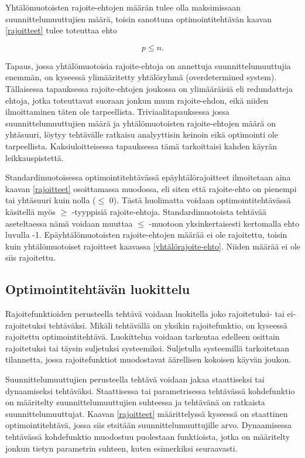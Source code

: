 \documentclass[12pt]{article}
\newenvironment{content}{\pagenumbering{arabic}}{}
\begin{document}
\begin{content}
Yhtälömuotoisten rajoite-ehtojen määrän tulee olla maksimissaan suunnittelumuuttujien määrä, toisin sanottuna optimointitehtävän kaavan \eqref{rajoitteet} tulee toteuttaa ehto

\begin{equation}
\label{yhtälörajoite-ehto}
p \leq n.
\end{equation}

Tapaus, jossa yhtälömuotoisia rajoite-ehtoja on annettuja suunnittelumuuttujia enemmän, on kyseessä ylimääritetty yhtälöryhmä (overdetermined system). Tällaisessa tapauksessa rajoite-ehtojen joukossa on ylimääräisiä eli redundatteja ehtoja, jotka toteuttavat suoraan jonkun muun rajoite-ehdon, eikä niiden ilmoittaminen täten ole tarpeellista. Triviaalitapauksessa jossa suunnittelumuuttujien määrä ja yhtälömuotoisten rajoite-ehtojen määrä on yhtäsuuri, löytyy tehtävälle ratkaisu analyyttisin keinoin eikä optimointi ole tarpeellista. Kaksiuloitteisessa tapauksessa tämä tarkoittaisi kahden käyrän leikkauspistettä. 

Standardimuotoisessa optimointitehtävässä epäyhtälörajoitteet ilmoitetaan aina kaavan \eqref{rajoitteet} osoittamassa muodossa, eli siten että rajoite-ehto on pienempi tai yhtäsuuri kuin nolla ($\leq$ 0). Tästä huolimatta voidaan optimointitehtävässä käsitellä myös $\geq$ -tyyppisiä rajoite-ehtoja. Standardimuotoista tehtävää aseteltaessa nämä voidaan muuttaa $\leq$ -muotoon yksinkertaisesti kertomalla ehto luvulla -1. Epäyhtälömuotoisten rajoite-ehtojen määrää ei ole rajoitettu, toisin kuin yhtälömuotoiset rajoitteet kaavassa \eqref{yhtälörajoite-ehto}. Niiden määrää ei ole siis rajoitettu.   \parencite[43]{intro}

\subsection{Optimointitehtävän luokittelu}


Rajoitefunktioiden perusteella tehtävä voidaan luokitella joko rajoitetuksi- tai ei-rajoitetuksi tehtäväksi. Mikäli tehtävällä on yksikin rajoitefunktio, on kyseessä rajoitettu optimointitehtävä. Luokittelua voidaan tarkentaa edelleen osittain rajoitetuksi tai täysin suljetuksi systeemiksi. Suljetulla systeemillä tarkoitetaan tilannetta, jossa rajoitefunktiot muodostavat äärellisen kokoisen käyvän joukon. 

Suunnittelumuuttujien perusteella tehtävä voidaan jakaa staattiseksi tai dynaamiseksi tehtäväksi. Staattisessa tai parametrisessa tehtävässä kohdefunktio on määritelty suunnittelumuuttujien suhteessa ja tehtävänä on ratkaista suunnittelumuuttujat. Kaavan \eqref{rajoitteet} määrittelyssä kyseessä on staattinen optimointitehtävä, jossa siis etsitään suunnittelumuuttujille arvo. Dynaamisessa tehtävässä kohdefunktio muodostuu puolestaan funktioista, jotka on määritelty jonkun tietyn parametrin suhteen, kuten esimerkiksi seuraavasti.


\end{content}
\end{document}
